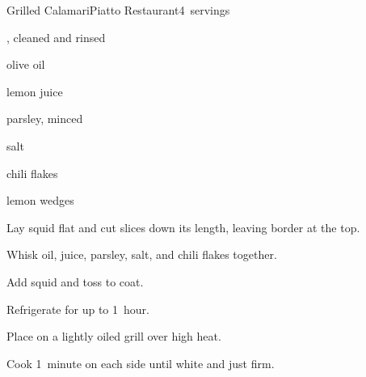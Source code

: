 \begin{recipe}{Grilled Calamari}{Piatto Restaurant}{4~servings}

\begin{ingredients}
\item {} , cleaned and rinsed
\item \C{\quarter} olive oil
\item {} lemon juice
\item {} parsley, minced
\item \tp{\half} salt
\item \tp{\half} chili flakes
\item lemon wedges
\end{ingredients}

\begin{directions}
\item Lay squid flat and cut \inch{\quarter} slices down its length, leaving \inch{\quarter} border at the top.
\item Whisk oil, juice, parsley, salt, and chili flakes together.
\item Add squid and toss to coat.
\item Refrigerate for up to 1~hour.
\item Place on a lightly oiled grill over high heat.
\item Cook 1~minute on each side until white and just firm.
\end{directions}

\end{recipe}
